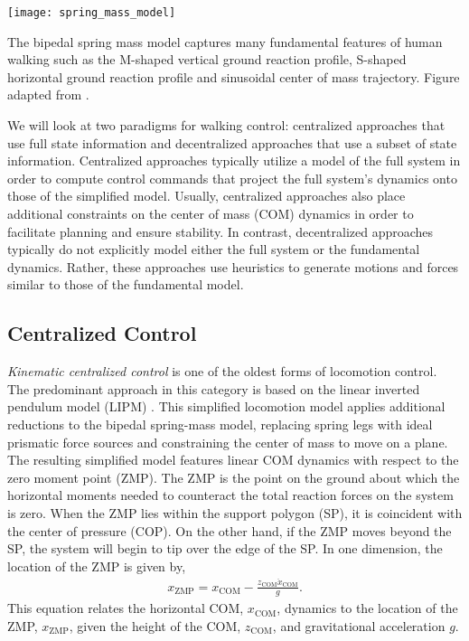 \begin{marginfigure}
    \centering
    \texttt{[image: spring\_mass\_model]}
    \caption{The bipedal spring mass model captures many fundamental features of
    human walking such as the M-shaped vertical ground reaction profile,
    S-shaped horizontal ground reaction profile and sinusoidal center of mass
    trajectory. Figure adapted from \citet{geyer2006compliant}.}
    \label{fig:ssm_diagram}
\end{marginfigure}

We will look at two paradigms for walking control: centralized approaches that
use full state information and decentralized approaches that use a subset of
state information. Centralized approaches typically utilize a model of the full
system in order to compute control commands that project the full system's
dynamics onto those of the simplified model. Usually, centralized approaches
also place additional constraints on the center of mass (COM) dynamics in order
to facilitate planning and ensure stability. In contrast, decentralized
approaches typically do not explicitly model either the full system or the
fundamental dynamics.  Rather, these approaches use heuristics to generate
motions and forces similar to those of the fundamental model.

\subsection{Centralized Control}\label{sec:back_centralized_control}

\emph{Kinematic centralized control} is one of the oldest forms of locomotion
control. The predominant approach in this category is based on the linear
inverted pendulum model (LIPM) \citep{kajita1991study, kajita20013d}.  This
simplified locomotion model applies additional reductions to the bipedal
spring-mass model, replacing spring legs with ideal prismatic force sources and
constraining the center of mass to move on a plane. The resulting simplified
model features linear COM dynamics with respect to the zero moment point (ZMP).
The ZMP is the point on the ground about which the horizontal moments needed to
counteract the total reaction forces on the system is zero. When the ZMP lies
within the support polygon (SP), it is coincident with the center of pressure (COP). On the other
hand, if the ZMP moves beyond the SP, the system will begin to tip over the edge
of the SP. In one dimension, the location of the ZMP is given by, 
\begin{align} 
    x_\textrm{ZMP} = x_\textrm{COM} - \frac{z_\textrm{COM}
        \ddot{x}_\textrm{COM}}{g}. 
    \label{eq:ZMP}
\end{align}
This equation relates the horizontal COM, $x_\textrm{COM}$, dynamics to the
location of the ZMP, $x_\textrm{ZMP}$, given the height of the COM,
$z_\textrm{COM}$, and gravitational acceleration $g$.


